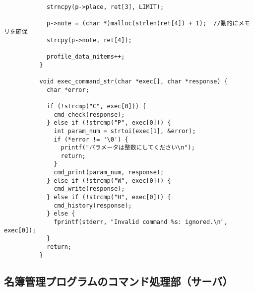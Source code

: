 \documentclass[11pt]{jsarticle}
\begin{document}
\begin{verbatim}
            strncpy(p->place, ret[3], LIMIT);
          
            p->note = (char *)malloc(strlen(ret[4]) + 1);  //動的にメモリを確保
            strcpy(p->note, ret[4]);
          
            profile_data_nitems++;
          }
          
          void exec_command_str(char *exec[], char *response) {
            char *error;
          
            if (!strcmp("C", exec[0])) {
              cmd_check(response);
            } else if (!strcmp("P", exec[0])) {
              int param_num = strtoi(exec[1], &error);
              if (*error != '\0') {
                printf("パラメータは整数にしてください\n");
                return;
              }
              cmd_print(param_num, response);
            } else if (!strcmp("W", exec[0])) {
              cmd_write(response);
            } else if (!strcmp("H", exec[0])) {
              cmd_history(response);
            } else {
              fprintf(stderr, "Invalid command %s: ignored.\n", exec[0]);
            }
            return;
          }   
\end{verbatim}

\subsection{名簿管理プログラムのコマンド処理部（サーバ）} \label{sec:commands_server.c}
\end{document}
